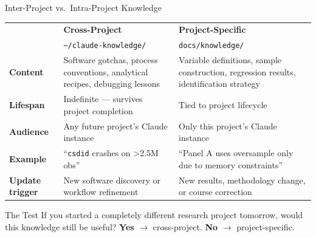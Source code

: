 \documentclass[aspectratio=169,11pt]{beamer}
\begin{document}
\begin{frame}[shrink=15]{Inter-Project vs.\ Intra-Project Knowledge}

\centering
\small
\renewcommand{\arraystretch}{1.25}
\begin{tabular}{>{\raggedright}p{3.0cm} >{\raggedright}p{4.5cm} >{\raggedright\arraybackslash}p{4.5cm}}
  \toprule
  & \textcolor{cGreen}{\textbf{Cross-Project}} & \textcolor{cPurple}{\textbf{Project-Specific}} \\
  & \scriptsize\texttt{\textasciitilde/claude-knowledge/} & \scriptsize\texttt{docs/knowledge/} \\
  \midrule
  \textbf{Content} &
    Software gotchas, process conventions, analytical recipes, debugging lessons &
    Variable definitions, sample construction, regression results, identification strategy \\
  \textbf{Lifespan} &
    Indefinite --- survives project completion &
    Tied to project lifecycle \\
  \textbf{Audience} &
    Any future project's Claude instance &
    Only this project's Claude instance \\
  \textbf{Example} &
    ``\texttt{csdid} crashes on >2.5M obs'' &
    ``Panel A uses oversample only due to memory constraints'' \\
  \textbf{Update trigger} &
    New software discovery or workflow refinement &
    New results, methodology change, or course correction \\
  \bottomrule
\end{tabular}

\bigskip

\begin{block}{The Test}
\small If you started a completely different research project tomorrow, would this knowledge still be useful? \textcolor{cGreen}{\textbf{Yes}} $\rightarrow$ cross-project. \textcolor{cPurple}{\textbf{No}} $\rightarrow$ project-specific.
\end{block}

\end{frame}
\end{document}
